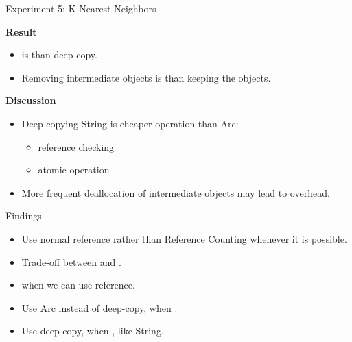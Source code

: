 \documentclass[9pt]{beamer}
\begin{document}


\begin{frame}[fragile]{Experiment 5: K-Nearest-Neighbors}
    
    \textbf{Result}
    \begin{itemize}
        \item {} is  than deep-copy.
        \item Removing intermediate objects is  than keeping the objects.
    \end{itemize}

    \vspace{0.5cm}

    \textbf{Discussion}
    \begin{itemize}
        \item Deep-copying String is cheaper operation than Arc: 
        \begin{itemize}
            \item reference checking
            \item atomic operation
        \end{itemize}
        \item More frequent deallocation of intermediate objects may lead to overhead.
    \end{itemize} 
\end{frame}



\begin{frame}[fragile]{Findings}
    \begin{itemize}
        \item Use normal reference rather than Reference Counting whenever it is possible.
        \item Trade-off between  and .
        \item {} when we can use reference.
        \item Use Arc instead of deep-copy, when .
        \item Use deep-copy, when , like String.
    \end{itemize}
\end{frame}

\end{document}
